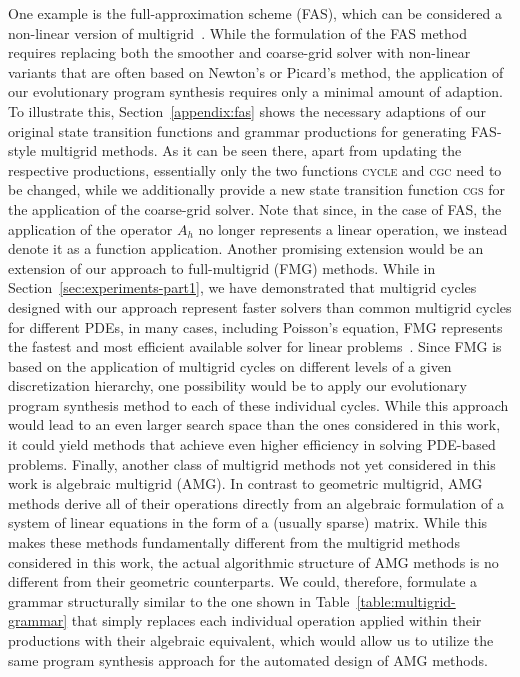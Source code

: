 One example is the full-approximation scheme (FAS), which can be considered a non-linear version of multigrid~\cite{trottenberg2000multigrid,briggs2000multigrid}.
While the formulation of the FAS method requires replacing both the smoother and coarse-grid solver with non-linear variants that are often based on Newton's or Picard's method, the application of our evolutionary program synthesis requires only a minimal amount of adaption.
To illustrate this, Section~\ref{appendix:fas} shows the necessary adaptions of our original state transition functions and grammar productions for generating FAS-style multigrid methods. 
As it can be seen there, apart from updating the respective productions, essentially only the two functions \textsc{cycle} and \textsc{cgc} need to be changed, while we additionally provide a new state transition function \textsc{cgs} for the application of the coarse-grid solver. 
Note that since, in the case of FAS, the application of the operator $A_h$ no longer represents a linear operation, we instead denote it as a function application.
Another promising extension would be an extension of our approach to full-multigrid (FMG) methods.
While in Section~\ref{sec:experiments-part1}, we have demonstrated that multigrid cycles designed with our approach represent faster solvers than common multigrid cycles for different PDEs, in many cases, including Poisson's equation, FMG represents the fastest and most efficient available solver for linear problems~\cite{trottenberg2000multigrid}.
Since FMG is based on the application of multigrid cycles on different levels of a given discretization hierarchy, one possibility would be to apply our evolutionary program synthesis method to each of these individual cycles.
While this approach would lead to an even larger search space than the ones considered in this work, it could yield methods that achieve even higher efficiency in solving PDE-based problems.
Finally, another class of multigrid methods not yet considered in this work is algebraic multigrid (AMG).
In contrast to geometric multigrid, AMG methods derive all of their operations directly from an algebraic formulation of a system of linear equations in the form of a (usually sparse) matrix.
While this makes these methods fundamentally different from the multigrid methods considered in this work, the actual algorithmic structure of AMG methods is no different from their geometric counterparts.
We could, therefore, formulate a grammar structurally similar to the one shown in Table~\ref{table:multigrid-grammar} that simply replaces each individual operation applied within their productions with their algebraic equivalent, which would allow us to utilize the same program synthesis approach for the automated design of AMG methods.
